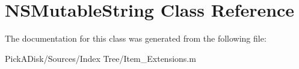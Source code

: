 \hypertarget{class_n_s_mutable_string}{
\section{NSMutableString Class Reference}
\label{class_n_s_mutable_string}
}


The documentation for this class was generated from the following file:\begin{DoxyCompactItemize}
\item 
PickADisk/Sources/Index Tree/Item\_\-Extensions.m\end{DoxyCompactItemize}
